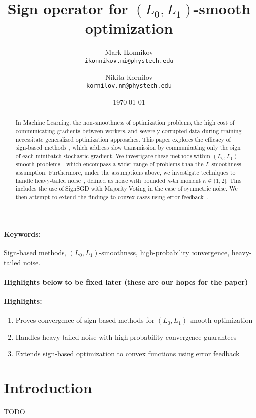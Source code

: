\documentclass[12pt]{article}
\title{Sign operator for $(L_0, L_1)$-smooth optimization}
\author{
  Mark Ikonnikov\\
  \texttt{ikonnikov.mi@phystech.edu}
  \and
  Nikita Kornilov\\
  \texttt{kornilov.nm@phystech.edu}
}
\date{\today}
\begin{document}
\maketitle


\begin{abstract}
In Machine Learning, the non-smoothness of optimization problems, the high cost of communicating gradients between workers, and severely corrupted data during training necessitate generalized optimization approaches. This paper explores the efficacy of sign-based methods~\cite{pmlr-v80-bernstein18a}, which address slow transmission by communicating only the sign of each minibatch stochastic gradient. We investigate these methods within $(L_0, L_1)$-smooth problems~\cite{gorbunov}, which encompass a wider range of problems than the $L$-smoothness assumption. Furthermore, under the assumptions above, we investigate techniques to handle heavy-tailed noise~\cite{Kornilov2025}, defined as noise with bounded $\kappa$-th moment $\kappa \in (1,2]$. This includes the use of SignSGD with Majority Voting in the case of symmetric noise. We then attempt to extend the findings to convex cases using error feedback~\cite{karimireddy}.
\end{abstract}

\paragraph{Keywords:} Sign-based methods, $(L_0, L_1)$-smoothness, high-probability convergence, heavy-tailed noise.

\paragraph{ Highlights below to be fixed later (these are our hopes for the paper)}

\paragraph{ Highlights:}
\begin{enumerate}
\item Proves convergence of sign-based methods for $(L_0, L_1)$-smooth optimization
\item Handles heavy-tailed noise with high-probability convergence guarantees
\item Extends sign-based optimization to convex functions using error feedback
\end{enumerate}

\section{Introduction}
TODO



\printbibliography
\end{document}
